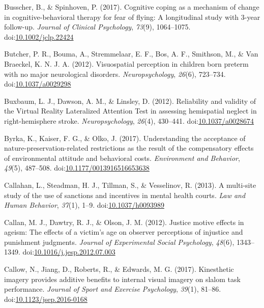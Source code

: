 \documentclass[english,man]{apa6}
\theoremstyle{definition}
\theoremstyle{definition}
\theoremstyle{definition}
\theoremstyle{remark}
\begin{document}
\hypertarget{ref-Busscher2017}{}
Busscher, B., \& Spinhoven, P. (2017). Cognitive coping as a mechanism
of change in cognitive-behavioral therapy for fear of flying: A
longitudinal study with 3-year follow-up. \emph{Journal of Clinical
Psychology}, \emph{73}(9), 1064--1075.
doi:\href{https://doi.org/10.1002/jclp.22424}{10.1002/jclp.22424}

\hypertarget{ref-Butcher2012}{}
Butcher, P. R., Bouma, A., Stremmelaar, E. F., Bos, A. F., Smithson, M.,
\& Van Braeckel, K. N. J. A. (2012). Visuospatial perception in children
born preterm with no major neurological disorders.
\emph{Neuropsychology}, \emph{26}(6), 723--734.
doi:\href{https://doi.org/10.1037/a0029298}{10.1037/a0029298}

\hypertarget{ref-Buxbaum}{}
Buxbaum, L. J., Dawson, A. M., \& Linsley, D. (2012). Reliability and
validity of the Virtual Reality Lateralized Attention Test in assessing
hemispatial neglect in right-hemisphere stroke. \emph{Neuropsychology},
\emph{26}(4), 430--441.
doi:\href{https://doi.org/10.1037/a0028674}{10.1037/a0028674}

\hypertarget{ref-Byrka2017}{}
Byrka, K., Kaiser, F. G., \& Olko, J. (2017). Understanding the
acceptance of nature-preservation-related restrictions as the result of
the compensatory effects of environmental attitude and behavioral costs.
\emph{Environment and Behavior}, \emph{49}(5), 487--508.
doi:\href{https://doi.org/10.1177/0013916516653638}{10.1177/0013916516653638}

\hypertarget{ref-Callahan2013}{}
Callahan, L., Steadman, H. J., Tillman, S., \& Vesselinov, R. (2013). A
multi-site study of the use of sanctions and incentives in mental health
courts. \emph{Law and Human Behavior}, \emph{37}(1), 1--9.
doi:\href{https://doi.org/10.1037/h0093989}{10.1037/h0093989}

\hypertarget{ref-Callan2012}{}
Callan, M. J., Dawtry, R. J., \& Olson, J. M. (2012). Justice motive
effects in ageism: The effects of a victim's age on observer perceptions
of injustice and punishment judgments. \emph{Journal of Experimental
Social Psychology}, \emph{48}(6), 1343--1349.
doi:\href{https://doi.org/10.1016/j.jesp.2012.07.003}{10.1016/j.jesp.2012.07.003}

\hypertarget{ref-Callow2017a}{}
Callow, N., Jiang, D., Roberts, R., \& Edwards, M. G. (2017).
Kinesthetic imagery provides additive benefits to internal visual
imagery on slalom task performance. \emph{Journal of Sport and Exercise
Psychology}, \emph{39}(1), 81--86.
doi:\href{https://doi.org/10.1123/jsep.2016-0168}{10.1123/jsep.2016-0168}
\end{document}
